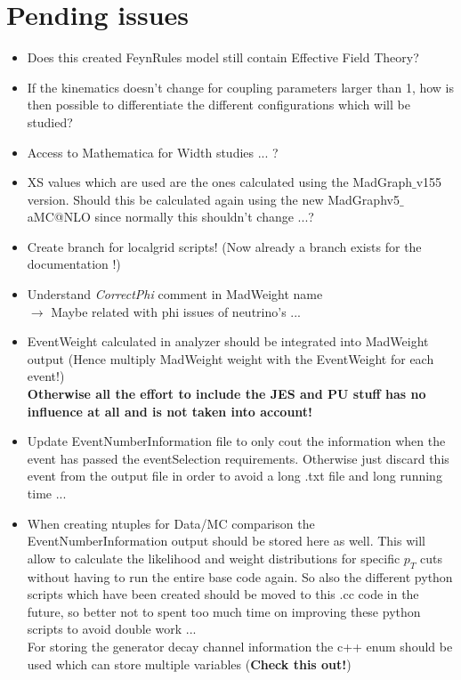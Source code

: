 \documentclass[a4paper,12pt]{report}
\date{Started 4 April 2014}
\begin{document}
\setcounter{secnumdepth}{3} %
\setcounter{tocdepth}{2}    %

\maketitle
\tableofcontents
\newpage

\chapter{Pending issues}
\begin{itemize}
  \item Does this created FeynRules model still contain Effective Field Theory?
  \item If the kinematics doesn't change for coupling parameters larger than 1, how is then possible to differentiate the different configurations which will be studied?
  \item Access to Mathematica for Width studies ... ?
  \item XS values which are used are the ones calculated using the MadGraph$\_$v155 version. Should this be calculated again using the new MadGraphv5$\_$aMC@NLO since normally this shouldn't change ...?
  \item Create branch for localgrid scripts! (Now already a branch exists for the documentation !)
  \item Understand \textit{CorrectPhi} comment in MadWeight name \\ $\rightarrow$ Maybe related with phi issues of neutrino's ...
  \item EventWeight calculated in analyzer should be integrated into MadWeight output (Hence multiply MadWeight weight with the EventWeight for each event!) \\ \textbf{Otherwise all the effort to include the JES and PU stuff has no influence at all and is not taken into account!							}
  \item Update EventNumberInformation file to only cout the information when the event has passed the eventSelection requirements. Otherwise just discard this event from the output file in order to avoid a long .txt file and long running time ...
  \item When creating ntuples for Data/MC comparison the EventNumberInformation output should be stored here as well. This will allow to calculate the likelihood and weight distributions for specific $p_T$ cuts without having to run the entire base code again. So also the different python scripts which have been created should be moved to this .cc code in the future, so better not to spent too much time on improving these python scripts to avoid double work ...\\ For storing the generator decay channel information the c++ enum should be used which can store multiple variables (\textbf{Check this out!})

\end{itemize}
\end{document}
